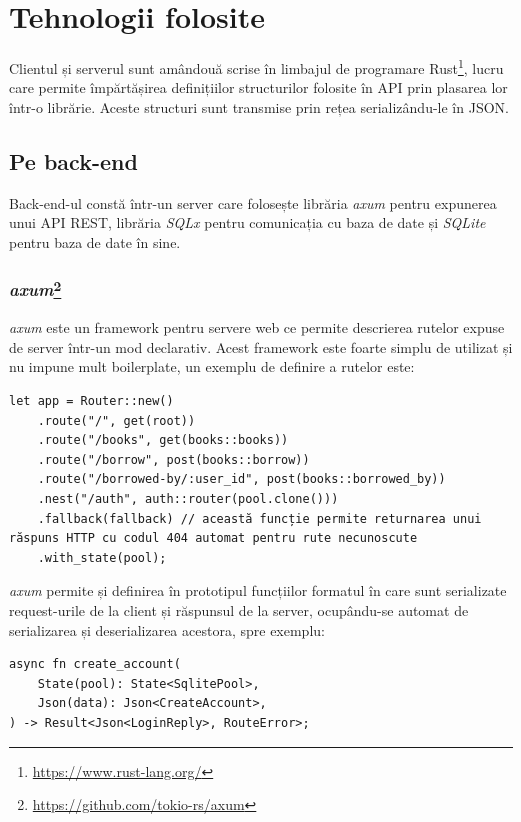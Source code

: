 \documentclass{article}
\begin{document}
    \section{Tehnologii folosite}

    Clientul și serverul sunt amândouă scrise în limbajul de programare Rust\footnote{\url{https://www.rust-lang.org/}},
    lucru care permite împărtășirea definițiilor structurilor folosite în API prin plasarea lor într-o librărie.
    Aceste structuri sunt transmise prin rețea serializându-le în JSON.

    \subsection{Pe back-end}

    Back-end-ul constă într-un server care folosește librăria \emph{axum} pentru expunerea unui API REST,
    librăria \emph{SQLx} pentru comunicația cu baza de date și \emph{SQLite} pentru baza de date în sine.

    \subsubsection*{\emph{axum}\footnote{\url{https://github.com/tokio-rs/axum}}}

    \emph{axum} este un framework pentru servere web ce permite descrierea rutelor expuse de server într-un mod
    declarativ. Acest framework este foarte simplu de utilizat și nu impune mult boilerplate, un exemplu de definire
    a rutelor este:
    \begin{verbatim}
let app = Router::new()
    .route("/", get(root))
    .route("/books", get(books::books))
    .route("/borrow", post(books::borrow))
    .route("/borrowed-by/:user_id", post(books::borrowed_by))
    .nest("/auth", auth::router(pool.clone()))
    .fallback(fallback) // această funcție permite returnarea unui răspuns HTTP cu codul 404 automat pentru rute necunoscute
    .with_state(pool);
    \end{verbatim}

    \emph{axum} permite și definirea în prototipul funcțiilor formatul în care sunt serializate request-urile de la client
    și răspunsul de la server, ocupându-se automat de serializarea și deserializarea acestora, spre exemplu:
    \begin{verbatim}
async fn create_account(
    State(pool): State<SqlitePool>,
    Json(data): Json<CreateAccount>,
) -> Result<Json<LoginReply>, RouteError>;
    \end{verbatim}
\end{document}
